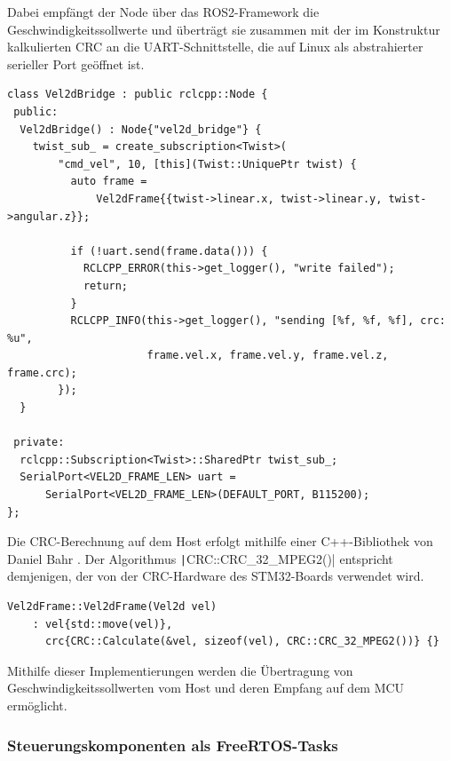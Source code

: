 Dabei empfängt der Node über das ROS2-Framework die Geschwindigkeitssollwerte
und überträgt sie zusammen mit der im Konstruktur kalkulierten CRC an die
UART-Schnittstelle, die auf Linux als abstrahierter serieller Port geöffnet ist.

\begin{code}
\begin{verbatim}
class Vel2dBridge : public rclcpp::Node {
 public:
  Vel2dBridge() : Node{"vel2d_bridge"} {
    twist_sub_ = create_subscription<Twist>(
        "cmd_vel", 10, [this](Twist::UniquePtr twist) {
          auto frame =
              Vel2dFrame{{twist->linear.x, twist->linear.y, twist->angular.z}};

          if (!uart.send(frame.data())) {
            RCLCPP_ERROR(this->get_logger(), "write failed");
            return;
          }
          RCLCPP_INFO(this->get_logger(), "sending [%f, %f, %f], crc: %u",
                      frame.vel.x, frame.vel.y, frame.vel.z, frame.crc);
        });
  }

 private:
  rclcpp::Subscription<Twist>::SharedPtr twist_sub_;
  SerialPort<VEL2D_FRAME_LEN> uart =
      SerialPort<VEL2D_FRAME_LEN>(DEFAULT_PORT, B115200);
};
\end{verbatim}
\end{code}

Die CRC-Berechnung auf dem Host erfolgt mithilfe einer C++-Bibliothek von Daniel
Bahr \cite{CRCpp}. Der Algorithmus \texttt|CRC::CRC_32_MPEG2()|
entspricht demjenigen, der von der CRC-Hardware des STM32-Boards verwendet wird.

\begin{code}
\begin{verbatim}
Vel2dFrame::Vel2dFrame(Vel2d vel)
    : vel{std::move(vel)},
      crc{CRC::Calculate(&vel, sizeof(vel), CRC::CRC_32_MPEG2())} {}
\end{verbatim}
\end{code}

Mithilfe dieser Implementierungen werden die Übertragung von
Geschwindigkeitssollwerten vom Host und deren Empfang auf dem MCU ermöglicht.

\subsubsection{Steuerungskomponenten als FreeRTOS-Tasks}

